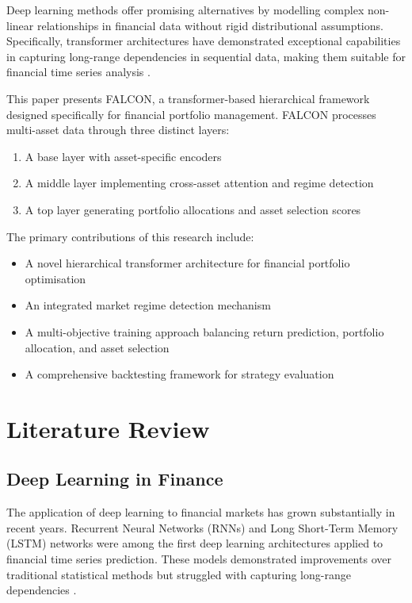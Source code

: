 \documentclass[conference]{IEEEtran}
\begin{document}
Deep learning methods offer promising alternatives by modelling complex non-linear relationships in financial data without rigid distributional assumptions. Specifically, transformer architectures have demonstrated exceptional capabilities in capturing long-range dependencies in sequential data, making them suitable for financial time series analysis \cite{vaswani2017attention}.

This paper presents FALCON, a transformer-based hierarchical framework designed specifically for financial portfolio management. FALCON processes multi-asset data through three distinct layers:

\begin{enumerate}
\item A base layer with asset-specific encoders
\item A middle layer implementing cross-asset attention and regime detection
\item A top layer generating portfolio allocations and asset selection scores
\end{enumerate}

The primary contributions of this research include:

\begin{itemize}
\item A novel hierarchical transformer architecture for financial portfolio optimisation
\item An integrated market regime detection mechanism
\item A multi-objective training approach balancing return prediction, portfolio allocation, and asset selection
\item A comprehensive backtesting framework for strategy evaluation
\end{itemize}

\section{Literature Review}

\subsection{Deep Learning in Finance}
The application of deep learning to financial markets has grown substantially in recent years. Recurrent Neural Networks (RNNs) and Long Short-Term Memory (LSTM) networks were among the first deep learning architectures applied to financial time series prediction. These models demonstrated improvements over traditional statistical methods but struggled with capturing long-range dependencies \cite{huck2009pairs}.
\end{document}
